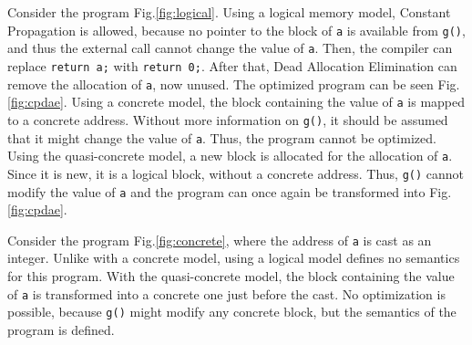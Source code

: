 Consider the program Fig.\ref{fig:logical}. Using a logical memory model, Constant Propagation is allowed, because no pointer to the block of \texttt{a} is available from \texttt{g()}, and thus the external call cannot change the value of \texttt{a}. Then, the compiler can replace \texttt{return a;} with \texttt{return 0;}. After that, Dead Allocation Elimination can remove the allocation of \texttt{a}, now unused. The optimized program can be seen Fig.\ref{fig:cpdae}.
Using a concrete model, the block containing the value of \texttt{a} is mapped to a concrete address. Without more information on \texttt{g()}, it should be assumed that it might change the value of \texttt{a}. Thus, the program cannot be optimized.
Using the quasi-concrete model, a new block is allocated for the allocation of \texttt{a}. Since it is new, it is a logical block, without a concrete address. Thus, \texttt{g()} cannot modify the value of \texttt{a} and the program can once again be transformed into Fig.\ref{fig:cpdae}.

Consider the program Fig.\ref{fig:concrete}, where the address of \texttt{a} is cast as an integer. Unlike with a concrete model, using a logical model defines no semantics for this program. With the quasi-concrete model, the block containing the value of \texttt{a} is transformed into a concrete one just before the cast. No optimization is possible, because \texttt{g()} might modify any concrete block, but the semantics of the program is defined.


